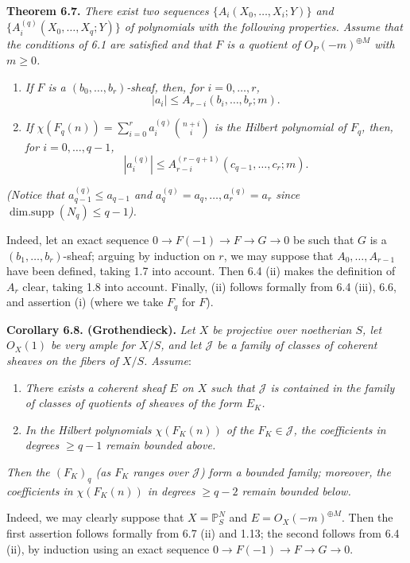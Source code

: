 \textbf{Theorem 6.7.} \emph{There exist two sequences $\{A_i(X_0,\ldots,X_i;Y)\}$ and $\{A_i^{(q)}(X_0,\ldots,X_q;Y)\}$ of polynomials with the following properties. Assume that the conditions of 6.1 are satisfied and that $F$ is a quotient of ${O}_P(-m)^{\oplus M}$ with $m\ge0$.}
\begin{enumerate}[label=(\roman*)]
\item \emph{If $F$ is a $(b_0,\ldots,b_r)$-sheaf, then, for $i=0,\ldots,r$,}
\[
   |a_i|\le A_{r-i}(b_i,\ldots,b_r;m).
\]
\item \emph{If $\chi(F_q(n))=\sum_{i=0}^{r} a_i^{(q)}\binom{n+i}{i}$ is the Hilbert polynomial of $F_q$, then, for $i=0,\ldots,q-1$,}
\[
   |a_i^{(q)}|\le A_{r-i}^{(r-q+1)}(c_{q-1},\ldots,c_r;m).
\]
\end{enumerate}
\emph{(Notice that $a_{q-1}^{(q)}\le a_{q-1}$ and $a_q^{(q)}=a_q,\ldots,a_r^{(q)}=a_r$ since $\operatorname{dim{.}supp}(N_q)\le q-1$).}

Indeed, let an exact sequence $0\to F(-1)\to F\to G\to0$ be such that $G$ is a $(b_1,\ldots,b_r)$-sheaf; arguing by induction on $r$, we may suppose that $A_0,\ldots,A_{r-1}$ have been defined, taking 1.7 into account. Then 6.4 (ii) makes the definition of $A_r$ clear, taking 1.8 into account. Finally, (ii) follows formally from 6.4 (iii), 6.6, and assertion (i) (where we take $F_q$ for $F$).

%
\textbf{Corollary 6.8. (Grothendieck).} \emph{Let $X$ be projective over noetherian $S$, let ${O}_X(1)$ be very ample for $X/S$, and let $\mathcal J$ be a family of classes of coherent sheaves on the fibers of $X/S$. Assume}:
\begin{enumerate}[label=(\alph*)]
\item \emph{There exists a coherent sheaf $E$ on $X$ such that $\mathcal J$ is contained in the family of classes of quotients of sheaves of the form $E_K$.}
\item[$(b_q)$] \emph{In the Hilbert polynomials $\chi(F_K(n))$ of the $F_K\in\mathcal J$, the coefficients in degrees $\ge q-1$ remain bounded above.}
\end{enumerate}
\emph{Then the $(F_K)_q$ (as $F_K$ ranges over $\mathcal J$) form a bounded family; moreover, the coefficients in $\chi(F_K(n))$ in degrees $\ge q-2$ remain bounded below.}

Indeed, we may clearly suppose that $X=\mathbb P^N_S$ and $E={O}_X(-m)^{\oplus M}$. Then the first assertion follows formally from 6.7 (ii) and 1.13; the second follows from 6.4 (ii), by induction using an exact sequence $0\to F(-1)\to F\to G\to0$.

